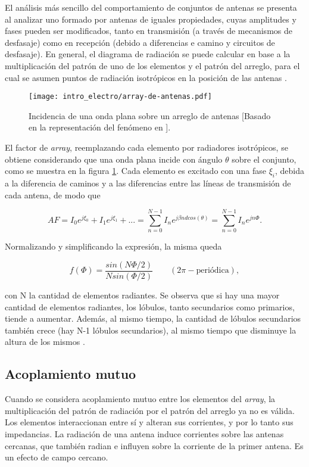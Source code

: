 El análisis más sencillo del comportamiento de conjuntos de antenas se presenta al analizar uno formado por antenas de iguales propiedades, cuyas amplitudes y fases pueden ser modificados, tanto en transmisión (a través de mecanismos de desfasaje) como en recepción (debido a diferencias e camino y circuitos de desfasaje). En general, el diagrama de radiación se puede calcular en base a la multiplicación del patrón de uno de los elementos y el patrón del arreglo, para el cual se asumen puntos de radiación isotrópicos en la posición de las antenas \cite{Balanis:Theory}.

\begin{figure}[htp]
	\centering
	\texttt{[image: intro\_electro/array-de-antenas.pdf]}
	\caption{Incidencia de una onda plana sobre un arreglo de antenas [Basado en la representación del fenómeno en \cite{Balanis:Theory}].}
	\label{fig:rayosincidentes-array}
\end{figure}

El factor de \textit{array}, reemplazando cada elemento por radiadores isotrópicos, se obtiene considerando que una onda plana incide con ángulo $\theta$ sobre el conjunto, como se muestra en la figura \ref{fig:rayosincidentes-array}. Cada elemento es excitado con una fase $\xi_i$, debida a la diferencia de caminos y a las diferencias entre las líneas de transmisión de cada antena, de modo que

\begin{equation}
AF=I_0e^{j\xi_0} + I_1e^{j\xi_1} + ... = \sum_{n=0}^{N-1} I_n e^{j\beta n d cos(\theta)}=\sum_{n=0}^{N-1} I_n e^{jn\Phi}.
\end{equation}

Normalizando y simplificando la expresión, la misma queda

\begin{equation}
	f(\Phi) = \frac{sin(N\Phi/2)}{N sin(\Phi/2)} \qquad (2\pi-\text{periódica}),
\end{equation}

con N la cantidad de elementos radiantes. Se observa que si hay una mayor cantidad de elementos radiantes, los lóbulos, tanto secundarios como primarios, tiende a aumentar. Además, al mismo tiempo, la cantidad de lóbulos secundarios también crece (hay N-1 lóbulos secundarios), al mismo tiempo que disminuye la altura de los mismos \cite{Stutzman:AntennaTheory}.

\subsection{Acoplamiento mutuo}
\label{subsec_acoplamiento}
Cuando se considera acoplamiento mutuo entre los elementos del \textit{array}, la multiplicación del patrón de radiación por el patrón del arreglo ya no es válida. Los elementos interaccionan entre sí y alteran sus corrientes, y por lo tanto sus impedancias. La radiación de una antena induce corrientes sobre las antenas cercanas, que también radian e influyen sobre la corriente de la primer antena. Es un efecto de campo cercano.

